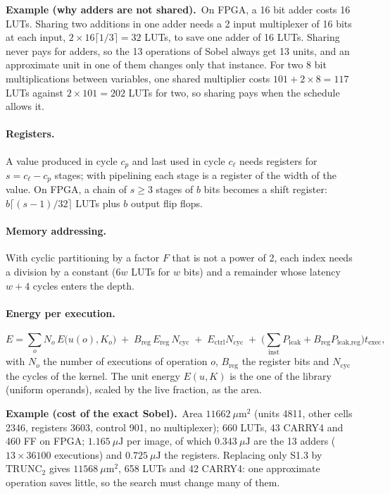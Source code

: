 \documentclass[11pt,a4paper]{article}
\newcommand{\examplebox}[2]{\par\medskip\noindent\colorbox{tabAzul!6}{\begin{minipage}{\dimexpr\linewidth-2\fboxsep}
  \textbf{Example (#1).}\ #2\end{minipage}}\par\medskip}
\begin{document}
\examplebox{why adders are not shared}{On FPGA, a 16 bit adder costs 16 LUTs. Sharing two additions in one adder needs
a 2 input multiplexer of 16 bits at each input, $2 \times 16 \lceil 1/3 \rceil = 32$ LUTs, to save one adder of 16
LUTs. Sharing never pays for adders, so the 13 operations of Sobel always get 13 units, and an approximate unit in one
of them changes only that instance. For two 8 bit multiplications between variables, one shared multiplier costs
$101 + 2 \times 8 = 117$ LUTs against $2 \times 101 = 202$ LUTs for two, so sharing pays when the schedule allows it.}

\paragraph{Registers.} A value produced in cycle $c_p$ and last used in cycle $c_\ell$ needs registers for
$s = c_\ell - c_p$ stages; with pipelining each stage is a register of the width of the value. On FPGA, a chain of
$s \ge 3$ stages of $b$ bits becomes a shift register: $b \lceil (s - 1)/32 \rceil$ LUTs plus $b$ output flip flops.

\paragraph{Memory addressing.} With cyclic partitioning by a factor $F$ that is not a power of 2, each index needs a
division by a constant ($6w$ LUTs for $w$ bits) and a remainder whose latency $w + 4$ cycles enters the depth.

\paragraph{Energy per execution.}
\[
  E = \sum_{o} N_o\, E\big(u(o), K_o\big) \;+\; B_{\text{reg}}\, E_{\text{reg}}\, N_{\text{cyc}}
      \;+\; E_{\text{ctrl}} N_{\text{cyc}} \;+\; \Big( \sum_{\text{inst}} P_{\text{leak}} + B_{\text{reg}} P_{\text{leak,reg}} \Big) t_{\text{exec}},
\]
with $N_o$ the number of executions of operation $o$, $B_{\text{reg}}$ the register bits and $N_{\text{cyc}}$ the
cycles of the kernel. The unit energy $E(u, K)$ is the one of the library (uniform operands), scaled by the live
fraction, as the area.

\examplebox{cost of the exact Sobel}{Area $11662\ \mu\text{m}^2$ (units 4811, other cells 2346, registers 3603,
control 901, no multiplexer); 660 LUTs, 43 CARRY4 and 460 FF on FPGA; $1.165\ \mu\text{J}$ per image, of which
$0.343\ \mu\text{J}$ are the 13 adders ($13 \times 36100$ executions) and $0.725\ \mu\text{J}$ the registers. Replacing
only S1.3 by $\text{TRUNC}_2$ gives $11568\ \mu\text{m}^2$, 658 LUTs and 42 CARRY4: one approximate operation saves
little, so the search must change many of them.}
\end{document}
